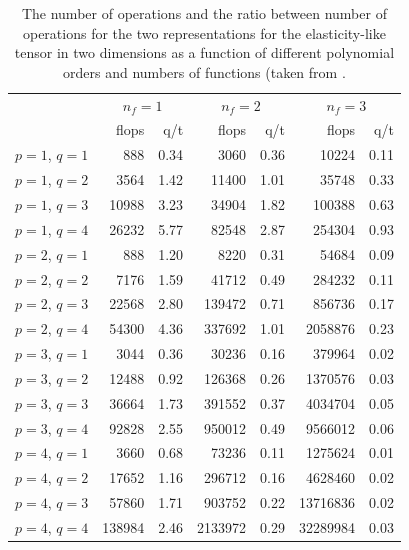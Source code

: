 \begin{table}
  \caption{The number of operations and the ratio between number of
    operations for the two representations for the elasticity-like
    tensor in two dimensions as a function of different polynomial
    orders and numbers of functions (taken from
    \citet{OelgaardWells2010}.}
  \label{oelgaard-2:tab:elasticity2D_complex_comparison}
  \begin{center}\small
    \begin{tabular}{l|rr|rr|rr}
      \multicolumn{1}{c}{} & \multicolumn{2}{c}{$n_f = 1$} & \multicolumn{2}{c}{$n_f = 2$} & \multicolumn{2}{c}{$n_f = 3$}\\
      & flops & q/t          & flops & q/t          & flops & q/t\\
      \hline
      $p = 1$, $q = 1$  &    888  &  0.34               &    3060 &  0.36               &   10224 & 0.11\\
      $p = 1$, $q = 2$  &   3564  &  1.42               &   11400 &  1.01               &   35748 & 0.33\\
      $p = 1$, $q = 3$  &  10988  &  3.23               &   34904 &  1.82               &  100388 & 0.63\\
      $p = 1$, $q = 4$  &  26232  &  5.77               &   82548 &  2.87               &  254304 & 0.93\\
      \hline
      $p = 2$, $q = 1$  &    888  &  1.20               &    8220 &  0.31               &   54684 & 0.09\\
      $p = 2$, $q = 2$  &   7176  &  1.59               &   41712 &  0.49               &  284232 & 0.11\\
      $p = 2$, $q = 3$  &  22568  &  2.80               &  139472 &  0.71               &  856736 & 0.17\\
      $p = 2$, $q = 4$  &  54300  &  4.36               &  337692 &  1.01               & 2058876 & 0.23\\
      \hline
      $p = 3$, $q = 1$  &   3044  &  0.36               &   30236 &  0.16               &  379964 & 0.02\\
      $p = 3$, $q = 2$  &  12488  &  0.92               &  126368 &  0.26               & 1370576 & 0.03\\
      $p = 3$, $q = 3$  &  36664  &  1.73               &  391552 &  0.37               & 4034704 & 0.05\\
      $p = 3$, $q = 4$  &  92828  &  2.55               &  950012 &  0.49               & 9566012 & 0.06\\
      \hline
      $p = 4$, $q = 1$  &   3660  &  0.68               &   73236 &  0.11               & 1275624 & 0.01\\
      $p = 4$, $q = 2$  &  17652  &  1.16               &  296712 &  0.16               & 4628460 & 0.02\\
      $p = 4$, $q = 3$  &  57860  &  1.71               &  903752 &  0.22               &13716836 & 0.02\\
      $p = 4$, $q = 4$  & 138984  &  2.46               & 2133972 &  0.29               &32289984 & 0.03
    \end{tabular}
  \end{center}
\end{table}

